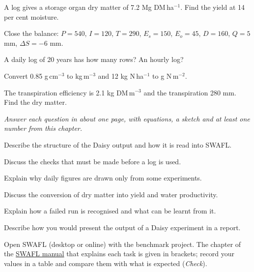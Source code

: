 \begin{exlist}
\item A log gives a storage organ dry matter of 7.2 Mg DM\,ha$^{-1}$. Find the yield at 14 per cent moisture.
\item Close the balance: $P=540$, $I=120$, $T=290$, $E_s=150$, $E_o=45$, $D=160$, $Q=5$ mm, $\Delta S=-6$ mm.
\item A daily log of 20 years has how many rows? An hourly log?
\item Convert 0.85 g\,cm$^{-3}$ to kg\,m$^{-3}$ and 12 kg N\,ha$^{-1}$ to g N\,m$^{-2}$.
\item The transpiration efficiency is 2.1 kg DM\,m$^{-3}$ and the transpiration 280 mm. Find the dry matter.
\end{exlist}
{\small\itshape Answer each question in about one page, with equations, a sketch and at least one number from this chapter.}\par\vspace{3pt}
\begin{exlist}
\item Describe the structure of the Daisy output and how it is read into SWAFL.
\item Discuss the checks that must be made before a log is used.
\item Explain why daily figures are drawn only from some experiments.
\item Discuss the conversion of dry matter into yield and water productivity.
\item Explain how a failed run is recognised and what can be learnt from it.
\item Describe how you would present the output of a Daisy experiment in a report.
\end{exlist}
{\small Open SWAFL (desktop or online) with the benchmark project. The chapter of the \href{https://github.com/halilunaziru73-creator/Coupled-Water-Fluxes-Pore-Scale-Dynamics-Precision-Irrigation-Mulching-Feedback-Loops/raw/main/Software/v1.1.0/SWAFL_Desktop/docs/manual_v1.1.0/SWAFL_Manual_v1.1.0.pdf}{SWAFL manual} that explains each task is given in brackets; record your values in a table and compare them with what is expected (\emph{Check}).}\par\vspace{3pt}
